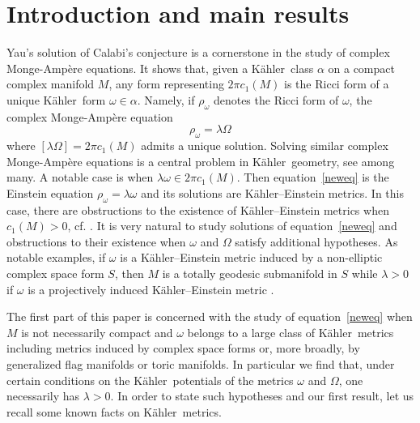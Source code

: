 \documentclass[12pt]{amsart}
\newcommand{\K}{K\"{a}hler}
\begin{document}
\maketitle
	\tableofcontents
	
	
\section{Introduction and  main results}\label{sectionint}
Yau's solution \cite{Yau78CalabiConjecture} of Calabi's conjecture is a cornerstone in the study of complex Monge-Amp\`ere equations.
It shows that, given a \K\ class $\alpha$ on a compact complex manifold $M$, any form representing $2\pi c_1(M)$ is the Ricci form of a unique \K\ form $\omega\in\alpha$. Namely, if $\rho_\omega$ denotes the Ricci form of $\omega$, the complex Monge-Amp\`ere equation
\begin{equation}\label{neweq}
	\rho_\omega=\lambda\Omega 
\end{equation}
where $[\lambda\Omega]=2\pi c_1(M)$ admits a unique solution. 
Solving similar complex Monge-Amp\`ere equations is a central problem in \K\ geometry, see \cite{Aubin78KE,ChenDonaldsonSunKEFanoI,ChenDonaldsonSunKEFanoII,ChenDonaldsonSunKEFanoIII,Tian15KStabilitySufficient} among many.
A notable case is when $\lambda\omega\in 2\pi c_1(M)$. Then equation~\eqref{neweq} is the Einstein equation
$	\rho_\omega=\lambda\omega $
and its solutions are \K--Einstein metrics. 
In this case, there are obstructions to the existence of \K--Einstein metrics when $c_1(M)>0$, cf. \cite{Futaki83Invariant,Tian97KStabilityNecessary}.
It is very natural to study solutions of equation~\eqref{neweq} and obstructions to their existence when $\omega$ and $\Omega$ satisfy additional hypotheses. As notable examples, if $\omega$ is a \K--Einstein metric induced by a non-elliptic complex space form $S$, then $M$ is a totally geodesic submanifold in $S$ \cite{Umehara87Einstein} while $\lambda>0$ if $\omega$ is a projectively induced \K--Einstein metric \cite{Hulin00KE}. 

The first part of this paper is concerned with the study of equation~\eqref{neweq} when $M$ is not necessarily compact and $\omega$ belongs to a large class of \K\ metrics including metrics induced by complex space forms or, more broadly, by generalized flag manifolds or toric manifolds.
In particular we find that, under certain conditions on the \K\ potentials of the metrics $\omega$ and $\Omega$, one necessarily has $\lambda>0$.
In order to state such hypotheses and our first result, let us recall some known facts on \K\ metrics.
\end{document}
